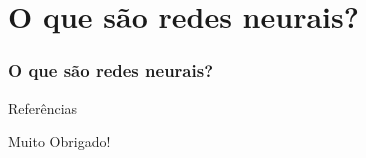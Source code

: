 \documentclass[aspectratio=169]{beamer}
\begin{document}
\section{O que são redes neurais?}
\begin{frame}
	\frametitle{O que são redes neurais?}
	\justifying
\end{frame}

\appendix

\begin{frame}{Referências}
    \tiny
    
    
\end{frame}

\begin{frame}[plain,c]
    \begin{center}
    \Huge Muito Obrigado!
    \end{center}
\end{frame}
\end{document}
